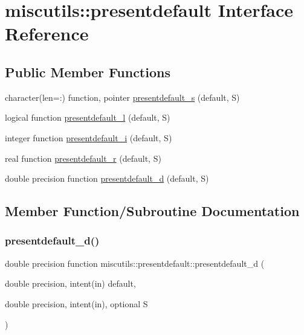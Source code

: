 \hypertarget{interfacemiscutils_1_1presentdefault}{}\section{miscutils\+:\+:presentdefault Interface Reference}
\label{interfacemiscutils_1_1presentdefault}
\subsection*{Public Member Functions}
\begin{DoxyCompactItemize}
\item 
character(len=\+:) function, pointer \mbox{\hyperlink{interfacemiscutils_1_1presentdefault_a57292dc30cdf84f88be79d7fcf5f8181}{presentdefault\+\_\+s}} (default, S)
\item 
logical function \mbox{\hyperlink{interfacemiscutils_1_1presentdefault_a9dad100c88a0f78ffc4e4fce0c2effd5}{presentdefault\+\_\+l}} (default, S)
\item 
integer function \mbox{\hyperlink{interfacemiscutils_1_1presentdefault_a021d39c65f43568dcc02919695b1be60}{presentdefault\+\_\+i}} (default, S)
\item 
real function \mbox{\hyperlink{interfacemiscutils_1_1presentdefault_a8b38f233fb9af34b06dfb4eb56ced739}{presentdefault\+\_\+r}} (default, S)
\item 
double precision function \mbox{\hyperlink{interfacemiscutils_1_1presentdefault_a50d1b157a6195af1453c74e891623508}{presentdefault\+\_\+d}} (default, S)
\end{DoxyCompactItemize}


\subsection{Member Function/\+Subroutine Documentation}
\mbox{\label{interfacemiscutils_1_1presentdefault_a50d1b157a6195af1453c74e891623508}} 
\subsubsection{\texorpdfstring{presentdefault\+\_\+d()}{presentdefault\_d()}}
{\footnotesize\ttfamily double precision function miscutils\+::presentdefault\+::presentdefault\+\_\+d (\begin{DoxyParamCaption}\item[{double precision, intent(in)}]{default,  }\item[{double precision, intent(in), optional}]{S }\end{DoxyParamCaption})}

